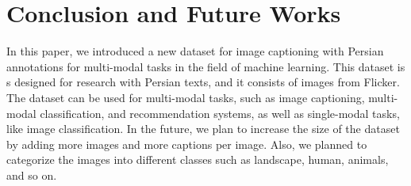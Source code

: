 \documentclass[10pt]{cai}
\begin{document}
\section{Conclusion and Future Works}
\label{conclusion}

In this paper, we introduced a new dataset for image captioning with Persian annotations for multi-modal tasks in the field of machine learning.
This dataset is s designed for research with Persian texts, and it consists of images from Flicker. 
The dataset can be used for multi-modal tasks, such as image captioning, multi-modal classification, and recommendation systems, as well as single-modal tasks, like image classification. 
In the future, we plan to increase the size of the dataset by adding more images and more captions per image. 
Also, we planned to categorize the images into different classes such as landscape, human, animals, and so on. 



\printbibliography[heading=subbibintoc]
\end{document}
